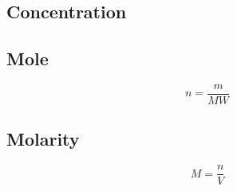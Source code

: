 \documentclass[Master.tex]{subfiles}
\begin{document}
\begin{multicols}{2}

		 \section{Concentration}

		  \subsection{Mole}
				   $$ n = \frac{m}{MW} $$

		  \subsection{Molarity}
				   $$ M=\frac{n}{V} $$
\end{multicols}
\end{document}
